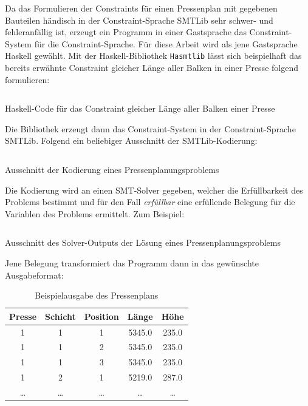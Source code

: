 Da das Formulieren der Constraints für einen Pressenplan mit gegebenen Bauteilen händisch in der Constraint-Sprache SMTLib sehr schwer- und fehleranfällig ist,
erzeugt ein Programm in einer Gastsprache das Constraint-System für die Constraint-Sprache.
Für diese Arbeit wird als jene Gastsprache Haskell \cite{haskellhistory} gewählt.
Mit der Haskell-Bibliothek \texttt{Hasmtlib} \cite{hasmtlib} lässt sich beispielhaft das bereits erwähnte Constraint gleicher Länge aller Balken in einer Presse folgend formulieren:

\begin{listing}[H]
    \inputminted[linenos=true]{haskell}{Code/Einleitung/PressenlängeConstraintHaskell.hs}
    \caption{Haskell-Code für das Constraint gleicher Länge aller Balken einer Presse}
    \label{listing:barLengthCode}
\end{listing}

Die Bibliothek erzeugt dann das Constraint-System in der Constraint-Sprache SMTLib.
Folgend ein beliebiger Ausschnitt der SMTLib-Kodierung:

\begin{listing}[H]
    \inputminted{bash}{Code/Einleitung/PressenlängeConstraintSMTLib.smt2}
    \caption{Ausschnitt der Kodierung eines Pressenplanungsproblems}
    \label{listing:barLengthSMTlib}
\end{listing}

Die Kodierung wird an einen SMT-Solver gegeben, welcher die Erfüllbarkeit des Problems bestimmt und für den Fall \textit{erfüllbar} eine erfüllende Belegung für die Variablen des Problems ermittelt.
Zum Beispiel:

\begin{listing}[H]
    \inputminted[linenos=true]{bash}{Code/Einleitung/PressenlängeConstraintSolverOutput.smt2}
    \caption{Ausschnitt des Solver-Outputs der Lösung eines Pressenplanungsproblems}
    \label{listing:barLengthSolverOutput}
\end{listing}

Jene Belegung transformiert das Programm dann in das gewünschte Ausgabeformat:

\begin{table}[H]
    \centering
    \begin{tabular}{|c|c|c|c|c|}
        \hline
        \textbf{Presse} & \textbf{Schicht} & \textbf{Position} & \textbf{Länge} & \textbf{Höhe} \\
        \hline
        1 & 1 & 1 & 5345.0 & 235.0 \\
        1 & 1 & 2 & 5345.0 & 235.0 \\
        1 & 1 & 3 & 5345.0 & 235.0 \\
        1 & 2 & 1 & 5219.0 & 287.0 \\
        \ldots & \ldots & \ldots & \ldots & \ldots \\
        \hline
    \end{tabular}
    \caption{Beispielausgabe des Pressenplans}
    \label{table:pressenplan}
\end{table}

